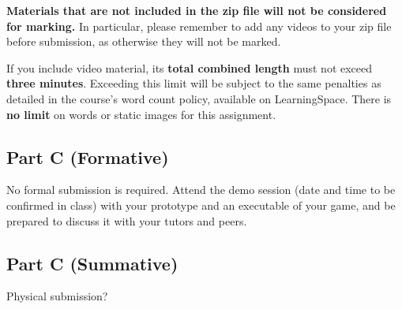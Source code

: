 \documentclass{../fal_assignment}
\begin{document}
\textbf{Materials that are not included in the zip file will not be considered for marking.}
In particular, please remember to add any videos to your zip file before submission,
as otherwise they will not be marked.

If you include video material, its \textbf{total combined length} must not exceed \textbf{three minutes}.
Exceeding this limit will be subject to the same penalties as detailed in the course's word count policy,
available on LearningSpace.
There is \textbf{no limit} on words or static images for this assignment.

\subsection*{Part C (Formative)}

No formal submission is required.
Attend the demo session (date and time to be confirmed in class)
with your prototype and an executable of your game,
and be prepared to discuss it with your tutors and peers.

\subsection*{Part C (Summative)}

Physical submission?
\end{document}
